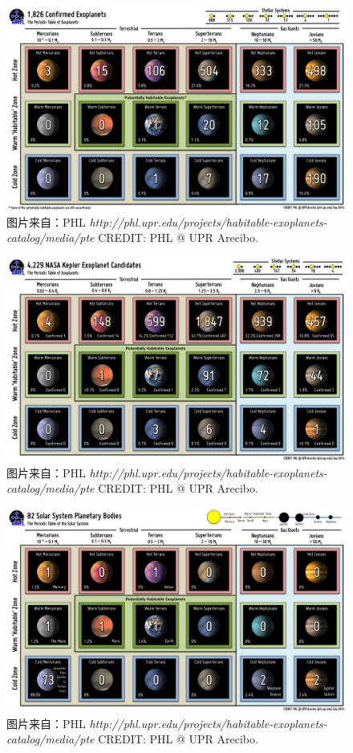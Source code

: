 \documentclass[letterpaper,10pt,english]{sphinxmanual}
\begin{document}
\begin{figure}[htbp]
\centering
\capstart

\includegraphics{PT_Confirmed.jpg}
\caption{图片来自：PHL \emph{http://phl.upr.edu/projects/habitable-exoplanets-catalog/media/pte}  CREDIT: PHL @ UPR Arecibo.}\end{figure}
\begin{figure}[htbp]
\centering
\capstart

\includegraphics{PT_Kepler.jpg}
\caption{图片来自：PHL \emph{http://phl.upr.edu/projects/habitable-exoplanets-catalog/media/pte}  CREDIT: PHL @ UPR Arecibo.}\end{figure}
\begin{figure}[htbp]
\centering
\capstart

\includegraphics{PT_Solar_System.jpg}
\caption{图片来自：PHL \emph{http://phl.upr.edu/projects/habitable-exoplanets-catalog/media/pte}  CREDIT: PHL @ UPR Arecibo.}\end{figure}
\end{document}
